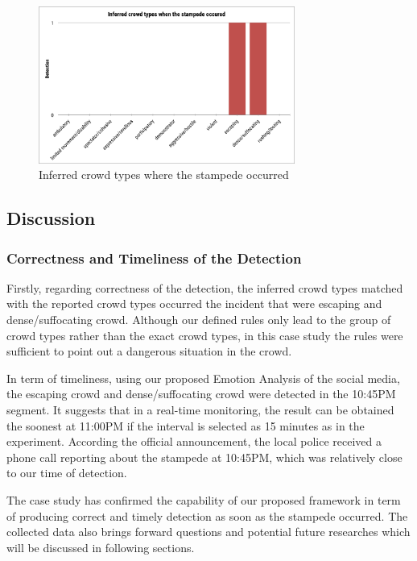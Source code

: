 \begin{figure}[!htbp]
\centering
\includegraphics[width=0.75\textwidth]{CrowdTypeStampede}
\caption{Inferred crowd types where the stampede occurred}
\label{fig:crowdTypeStampede}
\end{figure}

\subsection{Discussion}

\subsubsection{Correctness and Timeliness of the Detection}
Firstly, regarding correctness of the detection, the inferred crowd types matched with the reported crowd types occurred the incident that were escaping and dense/suffocating crowd. Although our defined rules only lead to the group of crowd types rather than the exact crowd types, in this case study the rules were sufficient to point out a dangerous situation in the crowd.

In term of timeliness, using our proposed Emotion Analysis of the social media, the escaping crowd and dense/suffocating crowd were detected in the 10:45PM segment. It suggests that in a real-time monitoring, the result can be obtained the soonest at 11:00PM if the interval is selected as 15 minutes as in the experiment. According the official announcement, the local police received a phone call reporting about the stampede at 10:45PM, which was relatively close to our time of detection.

The case study has confirmed the capability of our proposed framework in term of producing correct and timely detection as soon as the stampede occurred. The collected data also brings forward questions and potential future researches which will be discussed in following sections.

